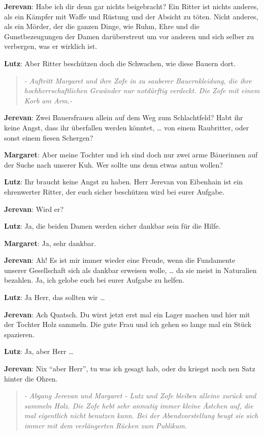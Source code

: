 \documentclass[a5paper,6pt]{book}
\begin{document}
\textbf{Jerevan}: Habe ich dir denn gar nichts beigebracht? Ein Ritter ist nichts anderes, als ein Kämpfer mit Waffe und Rüstung und der Absicht zu töten. Nicht anderes, als ein Mörder, der die ganzen Dinge, wie Ruhm, Ehre und die Gunstbezeugungen der Damen darüberstreut um vor anderen und sich selber zu verbergen, was er wirklich ist.

\textbf{Lutz}: Aber Ritter beschützen doch die Schwachen, wie diese Bauern dort.

\begin{quote}
  \textit{- Auftritt Margaret und ihre Zofe in zu sauberer Bauernkleidung, die ihre hochherrschaftlichen Gewänder nur notdürftig verdeckt. Die Zofe mit einem Korb am Arm.-
}
 \end{quote}

\textbf{Jerevan}: Zwei Bauersfrauen allein auf dem Weg zum Schlachtfeld? Habt ihr keine Angst, dass ihr überfallen werden könntet, … von einem Raubritter, oder sonst einem fiesen Schergen?

\textbf{Margaret}: Aber meine Tochter und ich sind doch nur zwei arme Bäuerinnen auf der Suche nach unserer Kuh. Wer sollte uns denn etwas antun wollen?

\textbf{Lutz}: Ihr braucht keine Angst zu haben. Herr Jerevan von Eibenhain ist ein ehrenwerter Ritter, der euch sicher beschützen wird bei eurer Aufgabe.

\textbf{Jerevan}: Wird er?

\textbf{Lutz}: Ja, die beiden Damen werden sicher dankbar sein für die Hilfe.

\textbf{Margaret}: Ja, sehr dankbar.

\textbf{Jerevan}: Ah! Es ist mir immer wieder eine Freude, wenn die Fundamente unserer Gesellschaft sich als dankbar erweisen wolle, … da sie meist in Naturalien bezahlen.
Ja, ich gelobe euch bei eurer Aufgabe zu helfen.

\textbf{Lutz}: Ja Herr, das sollten wir …

\textbf{Jerevan}: Ach Quatsch. Du wirst jetzt erst mal ein Lager machen und hier mit der Tochter Holz sammeln. Die gute Frau und ich gehen so lange mal ein Stück spazieren.

\textbf{Lutz}: Ja, aber Herr …

\textbf{Jerevan}: Nix “aber Herr”, tu was ich gesagt hab, oder du kriegst noch nen Satz hinter die Ohren.

\begin{quote}
  \textit{- Abgang Jerevan und Margaret - Lutz und Zofe bleiben alleine zurück und sammeln Holz. Die Zofe hebt sehr anmutig immer kleine Ästchen auf, die mal eigentlich nicht benutzen kann.
Bei der Abendvorstellung beugt sie sich immer mit dem verlängerten Rücken zum Publikum.}
 \end{quote}
\end{document}
